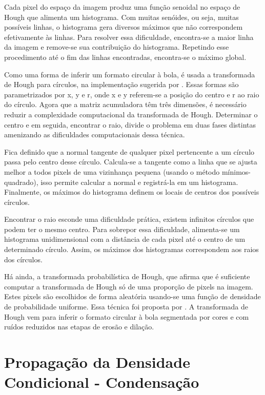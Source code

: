 Cada pixel do espaço da imagem produz uma função senoidal no espaço de Hough que alimenta um histograma. Com muitas senóides, ou seja, muitas possíveis linhas, o histograma gera diversos máximos que não correspondem efetivamente às linhas. Para resolver essa dificuldade, encontra-se a maior linha da imagem e remove-se sua contribuição do histograma. Repetindo esse procedimento até o fim das linhas encontradas, encontra-se o máximo global.

Como uma forma de inferir um formato circular à bola, é usada a transformada de Hough para círculos, na implementação sugerida por . Essas formas são parametrizados por x, y e r, onde x e y referem-se a posição do centro e r ao raio do círculo. Agora que a matriz acumuladora têm três dimensões, é necessário reduzir a complexidade computacional da transformada de Hough. Determinar o centro e em seguida, encontrar o raio, divide o problema em duas fases distintas amenizando as dificuldades computacionais dessa técnica.

Fica definido que a normal tangente de qualquer pixel pertencente a um círculo passa pelo centro desse círculo. Calcula-se a tangente como a linha que se ajusta melhor a todos pixels de uma vizinhança pequena (usando o método mínimos-quadrado), isso permite calcular a normal e registrá-la em um histograma. Finalmente, os máximos do histograma definem os locais de centros dos possíveis círculos. 

Encontrar o raio esconde uma dificuldade prática, existem infinitos círculos que podem ter o mesmo centro. Para sobrepor essa dificuldade, alimenta-se um histograma unidimensional com a distância de cada pixel até o centro de um determinado círculo. Assim, os máximos dos histogramas correspondem aos raios dos círculos.

Há ainda, a transformada probabilística de Hough, que afirma que é suficiente computar a transformada de Hough só de uma proporção de pixels na imagem. Estes pixels são escolhidos de forma aleatória usando-se uma função de densidade de probabilidade uniforme. Essa técnica foi  proposta por . A transformada de Hough vem para inferir o formato circular à bola segmentada por cores e com ruídos reduzidos nas etapas de erosão e dilação.

\section{Propagação da Densidade Condicional - Condensação}

